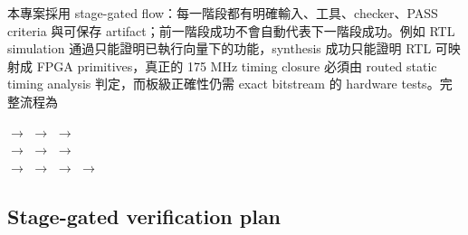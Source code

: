 \documentclass[UTF8,fontset=none,11pt,a4paper]{ctexrep}
\begin{document}
本專案採用 stage-gated flow：每一階段都有明確輸入、工具、checker、PASS criteria 與可保存 artifact；前一階段成功不會自動代表下一階段成功。例如 RTL simulation 通過只能證明已執行向量下的功能，synthesis 成功只能證明 RTL 可映射成 FPGA primitives，真正的 175 MHz timing closure 必須由 routed static timing analysis 判定，而板級正確性仍需 exact bitstream 的 hardware tests。完整流程為

\begin{center}
\small
{}
$\rightarrow$ 
$\rightarrow$ 
$\rightarrow$ 
\\[2mm]
$\rightarrow$ 
$\rightarrow$ 
$\rightarrow$ 
\\[2mm]
$\rightarrow$ 
$\rightarrow$ 
$\rightarrow$ 
$\rightarrow$ 
\end{center}

\subsection{Stage-gated verification plan}
\end{document}

